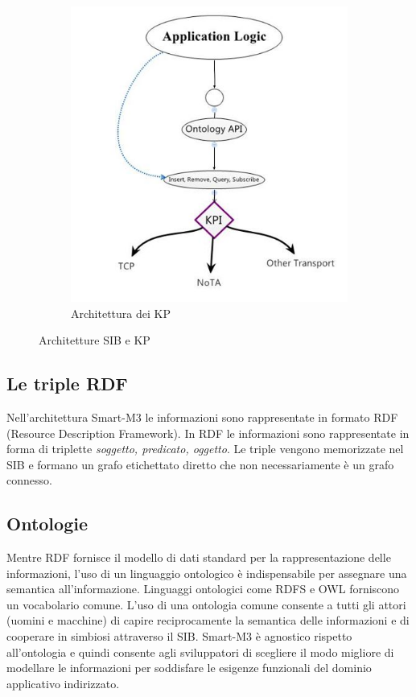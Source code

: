 \begin{figure}[H]
\begin{subfigure}[H]{0.42\textwidth}
                \includegraphics[width=\textwidth]{assets/kp-architecture.jpg}
                \caption{Architettura dei KP}
                \label{fig:kp-architecture}
        \end{subfigure}
        \caption{Architetture SIB e KP}
\end{figure}

\subsection{Le triple RDF}

Nell'architettura Smart-M3 le informazioni sono rappresentate in formato RDF (Resource Description Framework). In RDF le informazioni sono rappresentate in forma di triplette \emph{soggetto, predicato, oggetto}. Le triple vengono memorizzate nel SIB e formano un grafo etichettato diretto che non necessariamente è un grafo connesso.

\subsection{Ontologie}

Mentre RDF fornisce il modello di dati standard per la rappresentazione delle informazioni, l'uso di un linguaggio ontologico è indispensabile per assegnare una semantica all'informazione. Linguaggi ontologici come RDFS e OWL forniscono un vocabolario comune. L'uso di una ontologia comune consente a tutti gli attori (uomini e macchine) di capire reciprocamente la semantica delle informazioni e di cooperare in simbiosi attraverso il SIB. Smart-M3 è agnostico rispetto all'ontologia e quindi consente agli sviluppatori di scegliere il modo migliore di modellare le informazioni per soddisfare le esigenze funzionali del dominio applicativo indirizzato.

